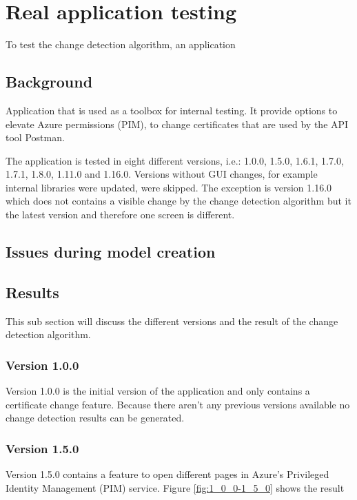 \section{Real application testing} \label{sec:real-application}
To test the change detection algorithm, an application 

\subsection{Background}
Application that is used as a toolbox for internal testing. It provide options to elevate Azure permissions (PIM), to change certificates that are used by the API tool Postman. 

The application is tested in eight different versions, i.e.: 1.0.0, 1.5.0, 1.6.1, 1.7.0, 1.7.1, 1.8.0, 1.11.0 and 1.16.0. Versions without GUI changes, for example internal libraries were updated, were skipped. The exception is version 1.16.0 which does not contains a visible change by the change detection algorithm but it the latest version and therefore one screen is different. 

\subsection{Issues during model creation}


\subsection{Results}
This sub section will discuss the different versions and the result of the change detection algorithm.

\subsubsection{Version 1.0.0}
Version 1.0.0 is the initial version of the application and only contains a certificate change feature. Because there aren't any previous versions available no change detection results can be generated.

\subsubsection{Version 1.5.0}
Version 1.5.0 contains a feature to open different pages in Azure's Privileged Identity Management (PIM) service. Figure \ref{fig:1_0_0-1_5_0} shows the result 

